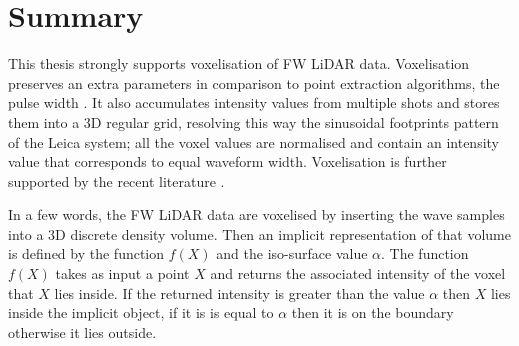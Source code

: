 \documentclass{subfiles}
\begin{document}
\section{Summary}

This thesis strongly supports voxelisation of FW LiDAR data. Voxelisation preserves an extra parameters in comparison to point extraction algorithms, the pulse width \cite{Sumnall2016}. It also accumulates intensity values from multiple shots and stores them into a 3D regular grid, resolving this way the sinusoidal footprints pattern of the Leica system; all the voxel values are normalised and contain an intensity value that corresponds to equal waveform width. Voxelisation is further supported by the recent literature \cite{Cao2016} \cite{Sumnall2016}. 


In a few words, the FW LiDAR data are voxelised by inserting the wave samples into a 3D discrete density volume. Then an implicit representation of that volume is defined by the function $f(X)$ and the iso-surface value $\alpha$. The function $f(X)$ takes as input a point $X$ and returns the associated intensity of the voxel that $X$ lies inside. If the returned intensity is greater than the value $\alpha$ then $X$ lies inside the implicit object, if it is is equal to $\alpha$ then it is on the boundary otherwise it lies outside. 
\end{document}
